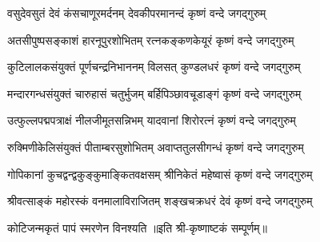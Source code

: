 
\twolineshloka
{वसुदेवसुतं देवं कंसचाणूरमर्दनम्}
{देवकीपरमानन्दं कृष्णं वन्दे जगद्गुरुम्}

\twolineshloka
{अतसीपुष्पसङ्काशं हारनूपुरशोभितम्}
{रत्नकङ्कणकेयूरं कृष्णं वन्दे जगद्गुरुम्}

\twolineshloka
{कुटिलालकसंयुक्तं पूर्णचन्द्रनिभाननम्}
{विलसत् कुण्डलधरं कृष्णं वन्दे जगद्गुरुम्}

\twolineshloka
{मन्दारगन्धसंयुक्तं चारुहासं चतुर्भुजम्}
{बर्हिपिञ्छावचूडाङ्गं कृष्णं वन्दे जगद्गुरुम्}

\twolineshloka
{उत्फुल्लपद्मपत्राक्षं नीलजीमूतसन्निभम्}
{यादवानां शिरोरत्नं कृष्णं वन्दे जगद्गुरुम्}

\twolineshloka
{रुक्मिणीकेलिसंयुक्तं पीताम्बरसुशोभितम्}
{अवाप्ततुलसीगन्धं कृष्णं वन्दे जगद्गुरुम्}

\twolineshloka
{गोपिकानां कुचद्वन्द्वकुङ्कुमाङ्कितवक्षसम्}
{श्रीनिकेतं महेष्वासं कृष्णं वन्दे जगद्गुरुम्}

\twolineshloka
{श्रीवत्साङ्कं महोरस्कं वनमालाविराजितम्}
{शङ्खचक्रधरं देवं कृष्णं वन्दे जगद्गुरुम्}

{कोटिजन्मकृतं पापं स्मरणेन विनश्यति}
॥इति श्री-कृष्णाष्टकं सम्पूर्णम्॥